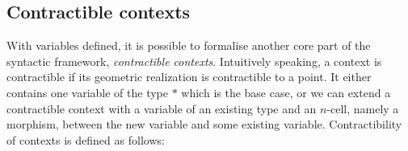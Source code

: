 \begin{code}\>\<%
\\
\>  \<%
\\
\>[0]\<[2]%
\>[2] \<[7]%
\>[7]\AgdaSymbol{:} \AgdaSymbol{\}\{} \AgdaSymbol{:}  \AgdaSymbol{\}}      \<%
\\
\>[0]\<[2]%
\>[2] \<[7]%
\>[7]\AgdaSymbol{:}  \AgdaSymbol{\}}     \AgdaSymbol{(} \AgdaSymbol{:}   \AgdaSymbol{)} \<[42]%
\>[42]\<%
\\
\>[2]\<[7]%
\>[7] \AgdaSymbol{(} \AgdaSymbol{:}  \AgdaSymbol{)}   \AgdaSymbol{(} \AgdaFunction{[}  \AgdaFunction{]T}\AgdaSymbol{)}\<%
\\
\>\<\end{code}

\subsection{Contractible contexts}
With variables defined, it is possible to formalise another core part of the syntactic framework, \emph{contractible
contexts}. Intuitively speaking, a context is contractible if its geometric
realization is contractible to a point. It either contains one
variable of the type $*$ which is the base case, or we can extend a contractible context with a
variable of an existing type and an $n$-cell, namely a morphism,
between the new variable and some existing variable. Contractibility
of contexts is defined as follows:

